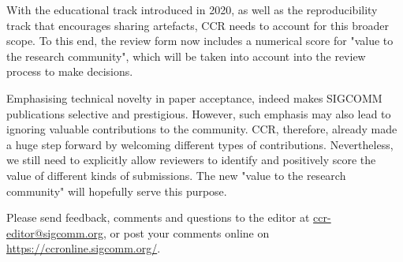 \documentclass[sigconf]{acmart}
\begin{document}
With the educational track introduced in 2020, as well as the reproducibility track that encourages sharing artefacts, CCR needs to account for this broader scope. To this end, the review form now includes a numerical score for "value to the research community", which will be taken into account into the review process to make decisions.

Emphasising technical novelty in paper acceptance, indeed makes SIGCOMM publications selective and prestigious. However, such emphasis may also lead to ignoring valuable contributions to the community. CCR, therefore, already made a huge step forward by welcoming different types of contributions. Nevertheless, we still need to explicitly allow reviewers to identify and positively score the value of different kinds of submissions. The new "value to the research community" will hopefully serve this purpose.

Please send feedback, comments and questions to the editor at \url{ccr-editor@sigcomm.org}, or post your comments online on \url{https://ccronline.sigcomm.org/}.       
    
\end{document}
